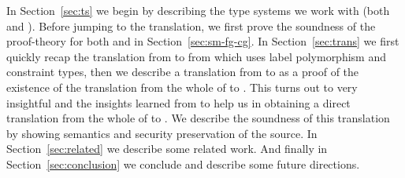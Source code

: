 
In Section~\ref{sec:ts} we begin by describing the type systems we work with (both {\fg} and
{\cg}). Before jumping to the translation, we first prove the soundness of the proof-theory for both
{\fg} and {\cg} in Section~\ref{sec:sm-fg-cg}. In Section~\ref{sec:trans} we first quickly recap the
translation from {\rfg} to {\cg} from \cite{siglog17-ifcComp} which uses label polymorphism and
constraint types, then we describe a translation from {\fg} to {\rfg} as a proof of the existence of
the translation from the whole of {\fg} to {\cg}. This turns out to very insightful and the insights
learned from {\fg} to {\rfg} help us in obtaining a direct translation from the whole of {\fg} to
{\cg}. We describe the soundness of this translation by showing semantics and security preservation
of the source. In Section~\ref{sec:related} we describe some related work. And finally in
Section~\ref{sec:conclusion} we conclude and describe some future directions.
\fi

